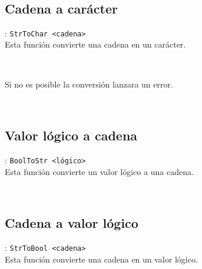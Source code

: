       \begin{fxcode}
         \\
      \end{fxcode}
      
      \subsection*{Cadena a carácter}: \texttt{StrToChar <cadena>}\\
      Esta función convierte una cadena en un carácter.
      
      \begin{fxcode}
         \\
      \end{fxcode}
      
      Si no es posible la conversión lanzara un error.
      
      \begin{fxcode}
         \\
      \end{fxcode}
      
      \subsection*{Valor lógico a cadena}: \texttt{BoolToStr <lógico>}\\
      Esta función convierte un valor lógico a una cadena.
      
      \begin{fxcode}
         \\
      \end{fxcode}
      
      \subsection*{Cadena a valor lógico}: \texttt{StrToBool <cadena>}\\
      Esta función convierte una cadena en un valor lógico.
      
      \begin{fxcode}
         \\
      \end{fxcode}
      
